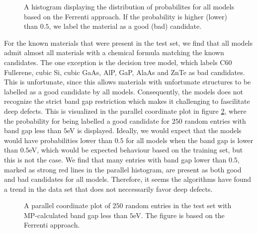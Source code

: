 \begin{figure}[ht!]
    \centering
    
    \vspace*{-130mm}
    \caption{A histogram displaying the distribution of probabilites for all models based on the Ferrenti approach. If the probability is higher (lower) than $0.5$, we label the material as a good (bad) candidate.}
    \label{fig:histogram-ferrenti}
\end{figure}

For the known materials that were present in the test set, we find that all models admit almost all materials with a chemical formula matching the known candidates. The one exception is the decision tree model, which labels C60 Fullerene, cubic Si, cubic GaAs, AlP, GaP, AlaAs and ZnTe as bad candidates. This is unfortunate, since this allows materials with unfortunate structures to be labelled as a good candidate by all models. Consequently, the models does not recognize the strict band gap restriction which makes it challenging to fascilitate deep defects. This is visualized in the parallel coordinate plot in figure \ref{fig:parallel-coordinates-ferrenti}, where the probability for being labelled a good candidate for $250$ random entries with band gap less than $5$eV is displayed. Ideally, we would expect that the models would have probabilities lower than $0.5$ for all models when the band gap is lower than $0.5$eV, which would be expected behaviour based on the training set, but this is not the case. We find that many entries with band gap lower than $0.5$, marked as strong red lines in the parallel histogram, are present as both good and bad candidates for all models. Therefore, it seems the algorithms have found a trend in the data set that does not neccessarily favor deep defects.

\begin{figure}[ht!]
    \centering
    
    \vspace*{-130mm}
    \caption{A parallel coordinate plot of $250$ random entries in the test set with MP-calculated band gap less than $5$eV. The figure is based on the Ferrenti approach.}
    \label{fig:parallel-coordinates-ferrenti}
\end{figure}

